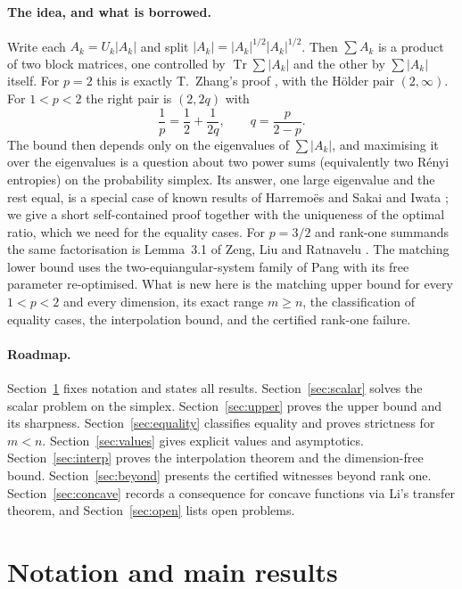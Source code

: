\documentclass[11pt,a4paper]{article}
\numberwithin{equation}{section}
\theoremstyle{definition}
\theoremstyle{remark}
\DeclareMathOperator{\Tr}{Tr}
\begin{document}
\paragraph{The idea, and what is borrowed.}
Write each \(A_k=U_k|A_k|\) and split \(|A_k|=|A_k|^{1/2}|A_k|^{1/2}\).
Then \(\sum A_k\) is a product of two block matrices, one controlled by
\(\Tr\sum|A_k|\) and the other by \(\sum|A_k|\) itself. For \(p=2\) this
is exactly T.~Zhang's proof \cite[Theorem 6.2]{Zhang}, with the Hölder
pair \((2,\infty)\). For \(1<p<2\) the right pair is \((2,2q)\) with
\[
 \frac1p=\frac12+\frac1{2q},\qquad q=\frac{p}{2-p}.
\]
The bound then depends only on the eigenvalues of \(\sum|A_k|\), and
maximising it over the eigenvalues is a question about two power sums
(equivalently two Rényi entropies) on the probability simplex. Its
answer, one large eigenvalue and the rest equal, is a special case of
known results of Harremoës \cite{Harremoes} and Sakai and Iwata
\cite{SakaiIwata}; we give a short self-contained proof together with
the uniqueness of the optimal ratio, which we need for the equality
cases. For \(p=3/2\) and rank-one summands the same factorisation is
Lemma~3.1 of Zeng, Liu and Ratnavelu \cite{ZengExact}. The matching
lower bound uses the two-equiangular-system family of Pang \cite{Pang}
with its free parameter re-optimised. What is new here is the matching
upper bound for every \(1<p<2\) and every dimension, its exact range
\(m\ge n\), the classification of equality cases, the interpolation
bound, and the certified rank-one failure.

\paragraph{Roadmap.}
Section~\ref{sec:results} fixes notation and states all results.
Section~\ref{sec:scalar} solves the scalar problem on the simplex.
Section~\ref{sec:upper} proves the upper bound and its sharpness.
Section~\ref{sec:equality} classifies equality and proves strictness
for \(m<n\). Section~\ref{sec:values} gives explicit values and
asymptotics. Section~\ref{sec:interp} proves the interpolation theorem
and the dimension-free bound. Section~\ref{sec:beyond} presents the
certified witnesses beyond rank one. Section~\ref{sec:concave} records
a consequence for concave functions via Li's transfer theorem, and
Section~\ref{sec:open} lists open problems.

\section{Notation and main results}\label{sec:results}
\end{document}
